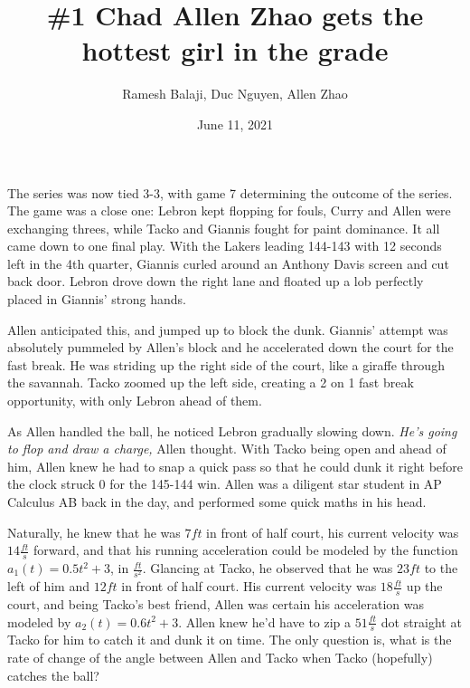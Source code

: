 \documentclass[xcolor={usenames, dvipsnames}]{beamer}
\title{\#1 Chad Allen Zhao gets the hottest girl in the grade}
\author{Ramesh Balaji, Duc Nguyen, Allen Zhao}
\date{June 11, 2021}
\begin{document}
\frame{\titlepage}

\begin{frame}
    The series was now tied 3-3, with game 7 determining the outcome of the series. 
    The game was a close one: Lebron kept flopping for fouls, Curry and Allen were 
    exchanging threes, while Tacko and Giannis fought for paint dominance. It all came 
    down to one final play. With the Lakers leading 144-143 with 12 seconds left in the 
    4th quarter, Giannis curled around an Anthony Davis screen and cut back door.
     Lebron drove down the right lane and floated up a lob perfectly placed in Giannis’ 
     strong hands. 
\end{frame}

\begin{frame}
    Allen anticipated this, and jumped up to block the dunk. Giannis'
    attempt was absolutely pummeled by Allen's block and he accelerated down the
    court for the fast break. He was striding up the right side of the court,
    like a giraffe through the savannah. Tacko zoomed up the left side, creating
    a 2 on 1 fast break opportunity, with only Lebron ahead of them.
\end{frame}
\begin{frame}
    As Allen handled the ball, he noticed Lebron gradually slowing down.
    \emph{He's going to flop and draw a charge,} Allen thought. With Tacko being open
    and ahead of him, Allen knew he had to snap a quick pass so that he could
    dunk it right before the clock struck 0 for the 145-144 win. Allen was a
    diligent star student in AP Calculus AB back in the day, and performed some
    quick maths in his head.
\end{frame}
\begin{frame}
    Naturally, he knew that he was $7 ft$ in front of half court, his
    current velocity was $14 \frac{ft}{s}$ forward, and that his running acceleration
    could be modeled by the function $a_{1}(t) = 0.5t^2 + 3$, in $\frac{ft}{s^2}$. 
    Glancing at Tacko, he observed that he was $23 ft$ to the left of him and $12 ft$ in
    front of half court. His current velocity was $18 \frac{ft}{s}$ up the court, and
    being Tacko's best friend, Allen was certain his acceleration was modeled by
    $a_2(t) = 0.6t^2 + 3$. Allen knew he'd have to zip a $51 \frac{ft}{s}$ dot straight at
    Tacko for him to catch it and dunk it on time. The only question is, what is the rate of 
    change of the angle between Allen and Tacko when Tacko (hopefully) catches the ball?
\end{frame}
\end{document}

